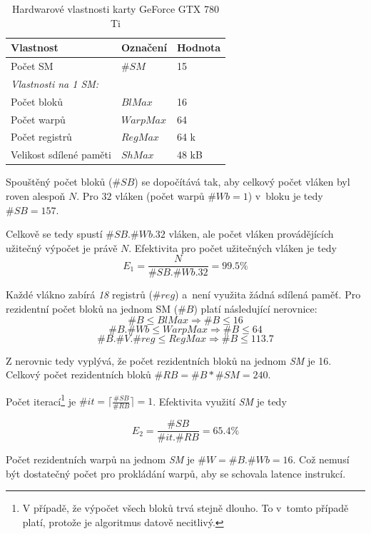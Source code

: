 \begin{table}[h!]
    \centering
    \begin{tabular}{lll}
        \hline
        Vlastnost                & Označení & Hodnota \\
        \hline
        Počet SM                 & $\#SM$    & 15      \\
        \hline
        \emph{Vlastnosti na 1 SM:} &         &		   \\
        \hline
        Počet bloků              & $BlMax$   & 16      \\
        Počet warpů              & $WarpMax$ & 64      \\
        Počet registrů           & $RegMax$  & 64 k   \\
        Velikost sdílené paměti  & $ShMax$   & 48 kB   \\
        \hline
    \end{tabular}
    \caption{Hardwarové vlastnosti karty GeForce GTX 780 Ti \cite{w:cuda}}
    \label{tab:cuda:hw}
\end{table}


Spouštěný počet bloků ($\#SB$) se dopočítává tak, aby celkový počet vláken byl roven alespoň $N$. Pro $32$ vláken (počet warpů $\#Wb = 1$) v~bloku je tedy $\#SB = 157$.

Celkově se tedy spustí $\#SB . \#Wb . 32$ vláken, ale počet vláken provádějících užitečný výpočet je právě $N$. Efektivita pro počet užitečných vláken je tedy
$$ E_1 = \frac{N}{\#SB . \#Wb . 32} = 99.5 \% $$


Každé vlákno zabírá \emph{18} registrů ($\#reg$) a~není využita žádná sdílená paměť. Pro rezidentní počet 
bloků na jednom SM ($\#B$)  platí následující nerovnice:
$$               \#B \leq BlMax   \Rightarrow  \#B \leq 16    $$
$$        \#B . \#Wb \leq WarpMax \Rightarrow  \#B \leq 64    $$
$$ \#B . \#V . \#reg \leq RegMax  \Rightarrow  \#B \leq 113.7 $$

Z nerovnic tedy vyplývá, že počet rezidentních bloků na jednom \emph{SM} je 16. Celkový počet rezidentních bloků $ \#RB = \#B * \#SM = 240 $.

Počet iterací\footnote{V případě, že výpočet všech bloků trvá stejně dlouho. To v~tomto případě platí, protože je algoritmus datově necitlivý.}
je $ \#it = \lceil \frac{\#SB}{\#RB} \rceil = 1 $. Efektivita využití \emph{SM} je tedy 

$$ E_2 = \frac{\#SB}{\#it . \#RB } = 65.4 \% $$

Počet rezidentních warpů na jednom \emph{SM} je  $ \#W = \#B . \#Wb = 16 $. Což nemusí být dostatečný počet pro prokládání
warpů, aby se schovala latence instrukcí.

